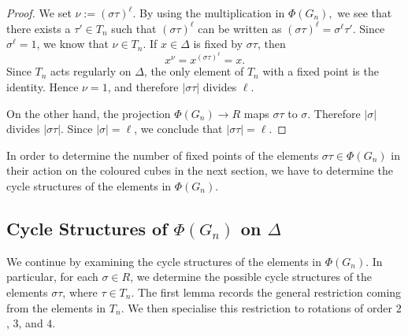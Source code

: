 \documentclass[12pt]{article}
\theoremstyle{definition}
\theoremstyle{remark}
\begin{document}
\begin{proof}
We set $\nu:=(\sigma\tau)^\ell$. By using the multiplication in $\Phi(G_n),$ we see that there exists a $\tau'\in T_n$ such that $(\sigma\tau)^\ell$ can be written as $(\sigma\tau)^\ell=\sigma^\ell\tau'.$ Since  $\sigma^\ell=1$, we know that $\nu\in T_n$. If $x\in\Delta$ is fixed by $\sigma\tau$, then
\[
x^\nu=x^{(\sigma\tau)^\ell}=x.
\]
Since $T_n$ acts regularly on $\Delta$, the only element of $T_n$ with a fixed point is the identity. Hence $\nu=1$, and therefore $|\sigma\tau|$ divides $\ell$.

On the other hand, the projection $\Phi(G_n)\to R$ maps $\sigma\tau$ to $\sigma$. Therefore $|\sigma|$ divides $|\sigma\tau|$. Since $|\sigma|=\ell$, we conclude that $|\sigma\tau|=\ell$.

\end{proof}


In order to determine the number of fixed points of the elements $\sigma\tau \in \Phi(G_n)$ in their action on the coloured cubes in the next section,
we have to determine the cycle structures of the elements in $\Phi(G_n).$

\subsection{Cycle Structures of $\Phi(G_n)$ on $\Delta$}

We continue by examining the cycle structures of the elements in $\Phi(G_n).$
In particular, for each $\sigma\in R$, we determine the possible cycle structures of the elements
$\sigma\tau$, where $\tau\in T_n$.
The first lemma records the general restriction coming from the elements in $T_n$. We then specialise this restriction to rotations of order $2$, $3$, and $4$.



\bigskip
\end{document}
